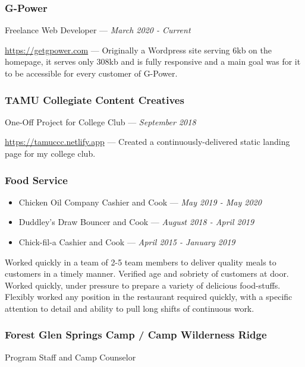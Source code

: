 \documentclass[letterpaper,10pt]{article}
\providecommand{\tightlist}
  {\setlength{\itemsep}{4pt}\setlength{\parskip}{0pt}}
\begin{document}
    \subsubsection{G-Power}
    \hfill Freelance Web Developer --- \emph{March 2020 - Current}

    \href{https://getgpower.com}{https://getgpower.com} --- Originally a Wordpress site serving 6kb on the homepage, it serves only 308kb and is fully responsive and a main goal was for it to be accessible for every customer of G-Power.

    \subsubsection{TAMU Collegiate Content Creatives}
    \hfill One-Off Project for College Club --- \emph{September 2018}

    \href{https://tamuccc.netlify.app}{https://tamuccc.netlify.app} --- Created a continuously-delivered static landing page for my college club.

    \subsubsection{Food Service}
    
    \begin{itemize}
        \tightlist{}
        \item
        Chicken Oil Company
        \hfill Cashier and Cook --- \emph{May 2019 - May 2020}

        \item
        Duddley's Draw
        \hfill Bouncer and Cook --- \emph{August 2018 - April 2019}

        \item
        Chick-fil-a
        \hfill Cashier and Cook --- \emph{April 2015 - January 2019}
    \end{itemize}

    Worked quickly in a team of 2-5 team members to deliver quality meals to customers in a timely manner. Verified age and sobriety of customers at door. Worked quickly, under pressure to prepare a variety of delicious food-stuffs.  Flexibly worked any position in the restaurant required quickly, with a specific attention to detail and ability to pull long shifts of continuous work.

    \subsubsection{Forest Glen Springs Camp / Camp Wilderness Ridge}
    \hfill Program Staff and Camp Counselor 
    
\end{document}
